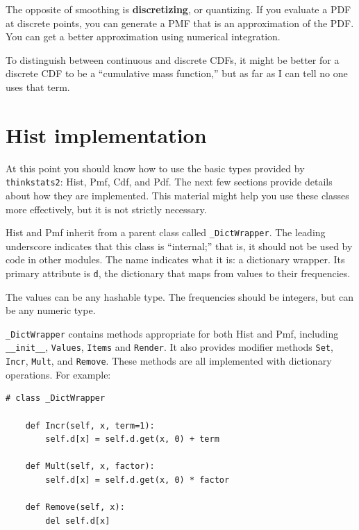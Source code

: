 \documentclass[12pt]{book}
\begin{document}
The opposite of smoothing is {\bf discretizing}, or quantizing.  If you
evaluate a PDF at discrete points, you can generate a PMF that is an
approximation of the PDF.  You can get a better approximation using
numerical integration.  

To distinguish between continuous and discrete CDFs, it might be
better for a discrete CDF to be a ``cumulative mass function,'' but as
far as I can tell no one uses that term.  



\section{Hist implementation}

At this point you should know how to use the basic types provided
by {\tt thinkstats2}: Hist, Pmf, Cdf, and Pdf.  The next few sections
provide details about how they are implemented.  This material
might help you use these classes more effectively, but it is not
strictly necessary.

Hist and Pmf inherit from a parent class called \verb"_DictWrapper".
The leading underscore indicates that this class is ``internal;'' that
is, it should not be used by code in other modules.  The name
indicates what it is: a dictionary wrapper.  Its primary attribute is
{\tt d}, the dictionary that maps from values to their frequencies.

The values can be any hashable type.  The frequencies should be integers,
but can be any numeric type.

\verb"_DictWrapper" contains methods appropriate for both
Hist and Pmf, including \verb"__init__", {\tt Values},
{\tt Items} and {\tt Render}.  It also provides modifier
methods {\tt Set}, {\tt Incr}, {\tt Mult}, and {\tt Remove}.  These
methods are all implemented with dictionary operations.  For example:

\begin{verbatim}
# class _DictWrapper

    def Incr(self, x, term=1):
        self.d[x] = self.d.get(x, 0) + term

    def Mult(self, x, factor):
        self.d[x] = self.d.get(x, 0) * factor

    def Remove(self, x):
        del self.d[x]
\end{verbatim}
\end{document}
